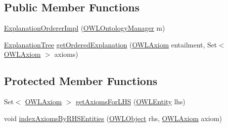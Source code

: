 \subsection*{Public Member Functions}
\begin{DoxyCompactItemize}
\item 
\hyperlink{classuk_1_1ac_1_1manchester_1_1cs_1_1owl_1_1explanation_1_1ordering_1_1_explanation_orderer_impl_adac72703ad272f4c8c35333705f56a5d}{Explanation\-Orderer\-Impl} (\hyperlink{interfaceorg_1_1semanticweb_1_1owlapi_1_1model_1_1_o_w_l_ontology_manager}{O\-W\-L\-Ontology\-Manager} m)
\item 
\hyperlink{classuk_1_1ac_1_1manchester_1_1cs_1_1owl_1_1explanation_1_1ordering_1_1_explanation_tree}{Explanation\-Tree} \hyperlink{classuk_1_1ac_1_1manchester_1_1cs_1_1owl_1_1explanation_1_1ordering_1_1_explanation_orderer_impl_a4d7b8ad9c2b34faac784bbb8f819736a}{get\-Ordered\-Explanation} (\hyperlink{interfaceorg_1_1semanticweb_1_1owlapi_1_1model_1_1_o_w_l_axiom}{O\-W\-L\-Axiom} entailment, Set$<$ \hyperlink{interfaceorg_1_1semanticweb_1_1owlapi_1_1model_1_1_o_w_l_axiom}{O\-W\-L\-Axiom} $>$ axioms)
\end{DoxyCompactItemize}
\subsection*{Protected Member Functions}
\begin{DoxyCompactItemize}
\item 
Set$<$ \hyperlink{interfaceorg_1_1semanticweb_1_1owlapi_1_1model_1_1_o_w_l_axiom}{O\-W\-L\-Axiom} $>$ \hyperlink{classuk_1_1ac_1_1manchester_1_1cs_1_1owl_1_1explanation_1_1ordering_1_1_explanation_orderer_impl_af8e0686cae19c16eaaf119cf9c85f6a5}{get\-Axioms\-For\-L\-H\-S} (\hyperlink{interfaceorg_1_1semanticweb_1_1owlapi_1_1model_1_1_o_w_l_entity}{O\-W\-L\-Entity} lhs)
\item 
void \hyperlink{classuk_1_1ac_1_1manchester_1_1cs_1_1owl_1_1explanation_1_1ordering_1_1_explanation_orderer_impl_a84a9958055156b50488b2542c92e708c}{index\-Axioms\-By\-R\-H\-S\-Entities} (\hyperlink{interfaceorg_1_1semanticweb_1_1owlapi_1_1model_1_1_o_w_l_object}{O\-W\-L\-Object} rhs, \hyperlink{interfaceorg_1_1semanticweb_1_1owlapi_1_1model_1_1_o_w_l_axiom}{O\-W\-L\-Axiom} axiom)
\end{DoxyCompactItemize}
